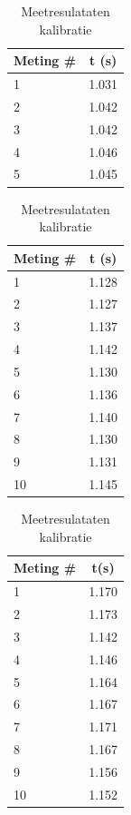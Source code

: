 \documentclass{report}
\begin{document}
\begin{table}
	\centering
	\caption{Meetresulataten kalibratie}
	\label{tab:measurementsCalib}
	\begin{subtable}[H]{0.30\textwidth}
		\centering
			\begin{tabular}{| l| c|}
		\hline
		   Meting \# & t (s) \\
		\hline
		   1& 1.031 \\
		\hline
		   2& 1.042 \\
		\hline
		   3& 1.042 \\
		\hline
		   4& 1.046 \\
		\hline
		   5& 1.045 \\
		\hline
		\end{tabular}
	\end{subtable}
	\quad
	\begin{subtable}[H]{0.30\textwidth}
		\centering
		\begin{tabular}{| l| c|}
		\hline
		   Meting \# & t (s) \\
		\hline
		   1& 1.128\\
		\hline
		   2& 1.127\\
		\hline
		   3& 1.137\\
		\hline
		  4& 1.142\\
		\hline
		   5& 1.130 \\
		\hline
		   6& 1.136\\
		\hline
		   7& 1.140\\
		\hline
		   8& 1.130\\
		\hline
		   9& 1.131\\
		\hline
		   10& 1.145 \\
		\hline
		\end{tabular}
	\end{subtable}
	\quad
	\begin{subtable}[H]{0.30\textwidth}
		\centering
		\begin{tabular}{| l| c|}
		\hline
		   Meting \# & t(s) \\
		\hline
		   1& 1.170 \\
		\hline
		   2& 1.173 \\
		\hline
		   3& 1.142 \\
		\hline
		   4& 1.146 \\
		\hline
		   5& 1.164 \\
		\hline
		   6& 1.167 \\
		\hline
		   7& 1.171 \\
		\hline
		   8& 1.167\\
		\hline
		   9& 1.156\\
		\hline
		   10& 1.152\\
		\hline
		\end{tabular}
	\end{subtable}
\end{table}
\end{document}
